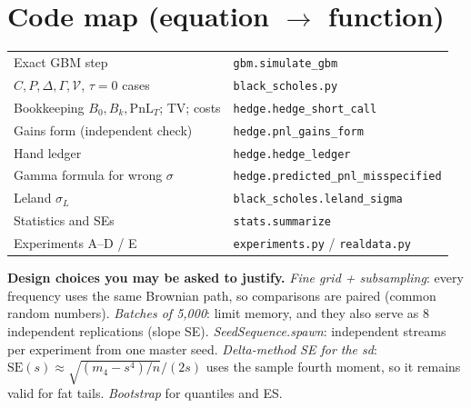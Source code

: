 \documentclass[10.5pt,a4paper]{article}
\newcommand{\PnL}{\mathrm{PnL}_T}
\begin{document}
\section{Code map (equation $\rightarrow$ function)}
\begin{tabular}{@{}ll@{}}\toprule
Exact GBM step & \texttt{gbm.simulate\_gbm}\\
$C,P,\Delta,\Gamma,\mathcal V$, $\tau=0$ cases & \texttt{black\_scholes.py}\\
Bookkeeping $B_0,B_k,\PnL$; TV; costs & \texttt{hedge.hedge\_short\_call}\\
Gains form (independent check) & \texttt{hedge.pnl\_gains\_form}\\
Hand ledger & \texttt{hedge.hedge\_ledger}\\
Gamma formula for wrong $\sigma$ & \texttt{hedge.predicted\_pnl\_misspecified}\\
Leland $\sigma_L$ & \texttt{black\_scholes.leland\_sigma}\\
Statistics and SEs & \texttt{stats.summarize}\\
Experiments A--D / E & \texttt{experiments.py} / \texttt{realdata.py}\\\bottomrule
\end{tabular}

\noindent\textbf{Design choices you may be asked to justify.} \emph{Fine grid + subsampling}: every frequency uses the same Brownian path, so comparisons are paired (common random numbers).
\emph{Batches of 5{,}000}: limit memory, and they also serve as 8 independent replications (slope SE). \emph{SeedSequence.spawn}: independent streams per experiment from one master seed.
\emph{Delta-method SE for the sd}: $\mathrm{SE}(s)\approx\sqrt{(m_4-s^4)/n}/(2s)$ uses the sample fourth moment, so it remains valid for fat tails. \emph{Bootstrap} for quantiles and ES.
\end{document}
